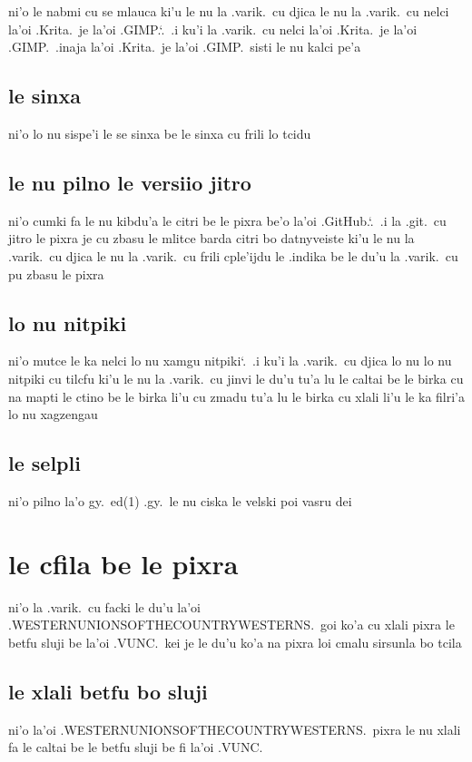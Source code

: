 \documentclass{report}
\newcommand\sds{\spacefactor\sfcode`.\ \space}
\begin{document}
ni'o le nabmi cu se mlauca ki'u le nu la .varik.\ cu djica le nu la .varik.\ cu nelci la'oi .Krita.\ je la'oi .GIMP.\sds  .i ku'i la .varik.\ cu nelci la'oi .Krita.\ je la'oi .GIMP.\  .inaja la'oi .Krita.\ je la'oi .GIMP.\ sisti le nu kalci pe'a

\subsection{le sinxa}
ni'o lo nu sispe'i le se sinxa be le sinxa cu frili lo tcidu

\subsection{le nu pilno le versiio jitro}
ni'o cumki fa le nu kibdu'a le citri be le pixra be'o la'oi .GitHub.\sds  .i la .git.\ cu jitro le pixra je cu zbasu le mlitce barda citri bo datnyveiste ki'u le nu la .varik.\ cu djica le nu la .varik.\ cu frili cple'ijdu le .indika be le du'u la .varik.\ cu pu zbasu le pixra

\subsection{lo nu nitpiki}
ni'o mutce le ka nelci lo nu xamgu nitpiki\sds  .i ku'i la .varik.\ cu djica lo nu lo nu nitpiki cu tilcfu ki'u le nu la .varik.\ cu jinvi le du'u tu'a lu le caltai be le birka cu na mapti le ctino be le birka li'u cu zmadu tu'a lu le birka cu xlali li'u le ka filri'a lo nu xagzengau

\subsection{le selpli}
ni'o pilno la'o gy.\ ed(1) .gy.\ le nu ciska le velski poi vasru dei

\section{le cfila be le pixra}
ni'o la .varik.\ cu facki le du'u la'oi .WESTERNUNIONSOFTHECOUNTRYWESTERNS.\ goi ko'a cu xlali pixra le betfu sluji be la'oi .VUNC.\ kei je le du'u ko'a na pixra loi cmalu sirsunla bo tcila

\subsection{le xlali betfu bo sluji}
ni'o la'oi .WESTERNUNIONSOFTHECOUNTRYWESTERNS.\ pixra le nu xlali fa le caltai be le betfu sluji be fi la'oi .VUNC.
\end{document}
